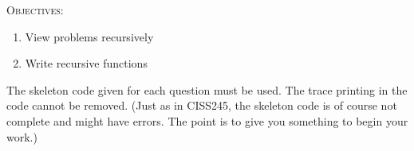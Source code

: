 \textsc{Objectives:}
\begin{enumerate}[topsep=0pt]
\item View problems recursively
\item Write recursive functions
\end{enumerate}


The skeleton code given for each question must be used.
The trace printing in the code cannot be removed.
(Just as in CISS245, the skeleton code is of course not complete
and might have errors. The point is to give you something to begin your
work.)
